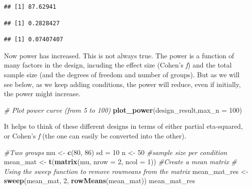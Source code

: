\documentclass[
]{book}
\newenvironment{Shaded}{\begin{snugshade}}{\end{snugshade}}
\newcommand{\CommentTok}[1]{\textcolor[rgb]{0.56,0.35,0.01}{\textit{#1}}}
\newcommand{\DataTypeTok}[1]{\textcolor[rgb]{0.13,0.29,0.53}{#1}}
\newcommand{\DecValTok}[1]{\textcolor[rgb]{0.00,0.00,0.81}{#1}}
\newcommand{\KeywordTok}[1]{\textcolor[rgb]{0.13,0.29,0.53}{\textbf{#1}}}
\newcommand{\NormalTok}[1]{#1}
\newcommand{\OperatorTok}[1]{\textcolor[rgb]{0.81,0.36,0.00}{\textbf{#1}}}
\newcommand{\StringTok}[1]{\textcolor[rgb]{0.31,0.60,0.02}{#1}}
\begin{document}
\begin{verbatim}
## [1] 87.62941
\end{verbatim}

\begin{Shaded}
\end{Shaded}

\begin{verbatim}
## [1] 0.2828427
\end{verbatim}

\begin{Shaded}
\end{Shaded}

\begin{verbatim}
## [1] 0.07407407
\end{verbatim}

Now power has increased. This is not always true. The power is a function of many factors in the design, incuding the effect size (Cohen's \emph{f}) and the total sample size (and the degrees of freedom and number of groups). But as we will see below, as we keep adding conditions, the power will reduce, even if initially, the power might increase.

\begin{Shaded}
\begin{Highlighting}[]
\CommentTok{# Plot power curve (from 5 to 100)}
\KeywordTok{plot_power}\NormalTok{(design_result,}\DataTypeTok{max_n =} \DecValTok{100}\NormalTok{)}
\end{Highlighting}
\end{Shaded}

It helps to think of these different designs in terms of either partial eta-squared, or Cohen's \emph{f} (the one can easily be converted into the other).

\begin{Shaded}
\begin{Highlighting}[]
\CommentTok{#Two groups}
\NormalTok{mu <-}\StringTok{ }\KeywordTok{c}\NormalTok{(}\DecValTok{80}\NormalTok{, }\DecValTok{86}\NormalTok{)}
\NormalTok{sd =}\StringTok{ }\DecValTok{10}
\NormalTok{n <-}\StringTok{ }\DecValTok{50} \CommentTok{#sample size per condition}
\NormalTok{mean_mat <-}\StringTok{ }\KeywordTok{t}\NormalTok{(}\KeywordTok{matrix}\NormalTok{(mu,}
\DataTypeTok{nrow =} \DecValTok{2}\NormalTok{,}
\DataTypeTok{ncol =} \DecValTok{1}\NormalTok{)) }\CommentTok{#Create a mean matrix}
\CommentTok{# Using the sweep function to remove rowmeans from the matrix}
\NormalTok{mean_mat_res <-}\StringTok{ }\KeywordTok{sweep}\NormalTok{(mean_mat, }\DecValTok{2}\NormalTok{, }\KeywordTok{rowMeans}\NormalTok{(mean_mat))}
\NormalTok{mean_mat_res}
\end{Highlighting}
\end{Shaded}
\end{document}
